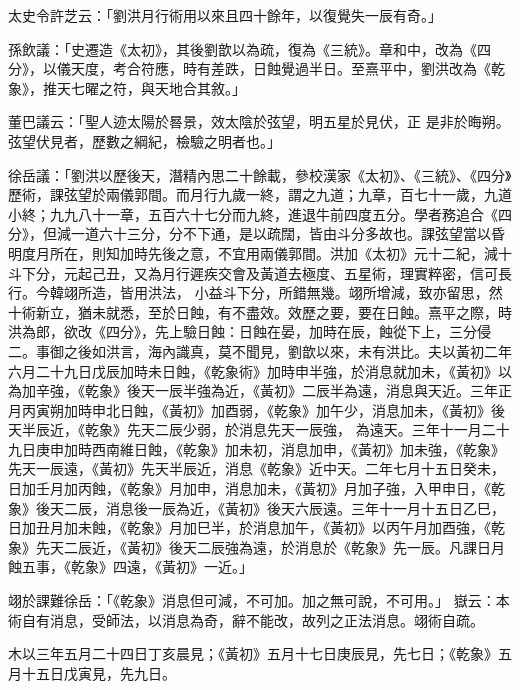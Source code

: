 \begin{pinyinscope}
 太史令許芝云：「劉洪月行術用以來且四十餘年，以復覺失一辰有奇。」



 孫飲議：「史遷造《太初》，其後劉歆以為疏，復為《三統》。章和中，改為《四分》，以儀天度，考合符應，時有差跌，日蝕覺過半日。至熹平中，劉洪改為《乾象》，推天七曜之符，與天地合其敘。」



 董巴議云：「聖人迹太陽於晷景，效太陰於弦望，明五星於見伏，正
 是非於晦朔。弦望伏見者，歷數之綱紀，檢驗之明者也。」



 徐岳議：「劉洪以歷後天，潛精內思二十餘載，參校漢家《太初》、《三統》、《四分》歷術，課弦望於兩儀郭間。而月行九歲一終，謂之九道；九章，百七十一歲，九道小終；九九八十一章，五百六十七分而九終，進退牛前四度五分。學者務追合《四分》，但減一道六十三分，分不下通，是以疏闊，皆由斗分多故也。課弦望當以昏明度月所在，則知加時先後之意，不宜用兩儀郭間。洪加《太初》元十二紀，減十斗下分，元起己丑，又為月行遲疾交會及黃道去極度、五星術，理實粹密，信可長行。今韓翊所造，皆用洪法，
 小益斗下分，所錯無幾。翊所增減，致亦留思，然十術新立，猶未就悉，至於日蝕，有不盡效。效歷之要，要在日蝕。熹平之際，時洪為郎，欲改《四分》，先上驗日蝕：日蝕在晏，加時在辰，蝕從下上，三分侵二。事御之後如洪言，海內識真，莫不聞見，劉歆以來，未有洪比。夫以黃初二年六月二十九日戊辰加時未日蝕，《乾象術》加時申半強，於消息就加未，《黃初》以為加辛強，《乾象》後天一辰半強為近，《黃初》二辰半為遠，消息與天近。三年正月丙寅朔加時申北日蝕，《黃初》加酉弱，《乾象》加午少，消息加未，《黃初》後天半辰近，《乾象》先天二辰少弱，於消息先天一辰強，
 為遠天。三年十一月二十九日庚申加時西南維日蝕，《乾象》加未初，消息加申，《黃初》加未強，《乾象》先天一辰遠，《黃初》先天半辰近，消息《乾象》近中天。二年七月十五日癸未，日加壬月加丙蝕，《乾象》月加申，消息加未，《黃初》月加子強，入甲申日，《乾象》後天二辰，消息後一辰為近，《黃初》後天六辰遠。三年十一月十五日乙巳，日加丑月加未蝕，《乾象》月加巳半，於消息加午，《黃初》以丙午月加酉強，《乾象》先天二辰近，《黃初》後天二辰強為遠，於消息於《乾象》先一辰。凡課日月蝕五事，《乾象》四遠，《黃初》一近。」



 翊於課難徐岳：「《乾象》消息但可減，不可加。加之無可說，不可用。」
 嶽云：本術自有消息，受師法，以消息為奇，辭不能改，故列之正法消息。翊術自疏。



 木以三年五月二十四日丁亥晨見；《黃初》五月十七日庚辰見，先七日；《乾象》五月十五日戊寅見，先九日。




\end{pinyinscope}
